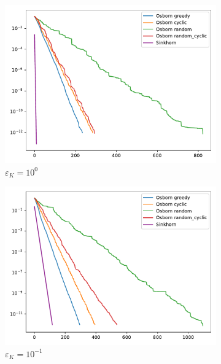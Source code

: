 \begin{figure}[H]
    \centering
    \begin{subfigure}[b]{.23\textwidth}
        \centering
        \includegraphics[width=\textwidth]{figures/dist2_kernel_1e-12/osborn_vs_sinkhorn_dist2_1.0_1e-12}
        \caption{\(\varepsilon_K = 10^{0}\)}
    \end{subfigure}
    \hfill
    \begin{subfigure}[b]{.23\textwidth}
        \centering
        \includegraphics[width=\textwidth]{figures/dist2_kernel_1e-12/osborn_vs_sinkhorn_dist2_0.1_1e-12}
        \caption{\(\varepsilon_K = 10^{-1}\)}
    \end{subfigure}
    \hfill
    \begin{subfigure}[b]{.23\textwidth}

\end{subfigure}
\end{figure}
